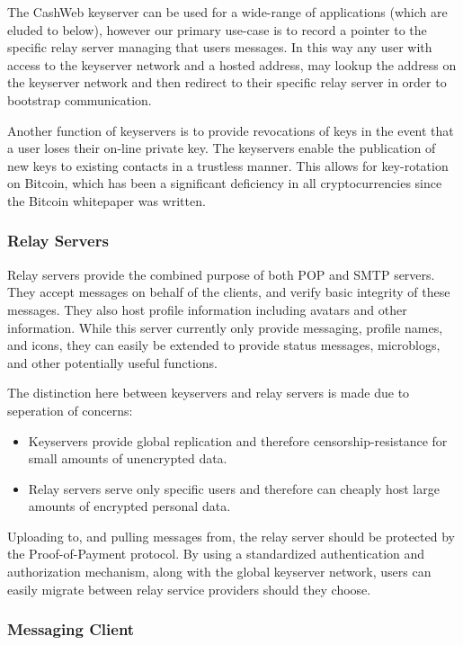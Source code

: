 \documentclass{article}
\begin{document}
The CashWeb keyserver can be used for a wide-range of applications (which are eluded to below), however our primary use-case is to record a pointer to the specific relay server managing that users messages. In this way any user with access to the keyserver network and a hosted address, may lookup the address on the keyserver network and then redirect to their specific relay server in order to bootstrap communication. 

Another function of keyservers is to provide revocations of keys in the event that a user loses their on-line private key. The keyservers enable the publication of new keys to existing contacts in a trustless manner. This allows for key-rotation on Bitcoin, which has been a significant deficiency in all cryptocurrencies since the Bitcoin whitepaper was written.

\subsubsection{Relay Servers}

Relay servers provide the combined purpose of both POP and SMTP servers. They accept messages on behalf of the clients, and verify basic integrity of these messages. They also host profile information including avatars and other information. While this server currently only provide messaging, profile names, and icons, they can easily be extended to provide status messages, microblogs, and other potentially useful functions.

The distinction here between keyservers and relay servers is made due to seperation of concerns:
\begin{itemize}
  \item Keyservers provide global replication and therefore censorship-resistance for small amounts of unencrypted data.
  \item Relay servers serve only specific users and therefore can cheaply host large amounts of encrypted personal data.
\end{itemize}

Uploading to, and pulling messages from, the relay server should be protected by the Proof-of-Payment protocol. By using a standardized authentication and authorization mechanism, along with the global keyserver network, users can easily migrate between relay service providers should they choose.

\subsubsection{Messaging Client}
\end{document}
